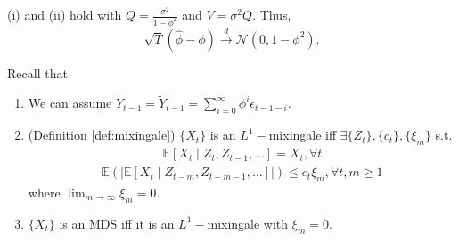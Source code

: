 \documentclass[11pt]{elegantbook}
\begin{document}
\begin{claim}
    (i) and (ii) hold with $Q=\frac{\sigma^2}{1-\phi^2}$ and $V=\sigma^2Q$. Thus, $$\sqrt{T}\left(\hat{\phi}-\phi\right) \stackrel{d}{\longrightarrow} \mathcal{N}\left(0,1-\phi^2\right).$$
\end{claim}


\begin{remark}
    Recall that
    \begin{enumerate}
        \item We can assume $Y_{t-1}=\tilde{Y}_{t-1}=\sum_{i=0}^\infty\phi^i\epsilon_{t-1-i}$.
        \item (Definition \ref{def:mixingale}) $\{X_t\}$ is an $L^1-$mixingale iff $\exists\{Z_t\},\{c_t\},\{\xi_m\}$ s.t.
        \begin{equation}
            \begin{aligned}
                \mathbb{E}[X_t\mid Z_t,Z_{t-1},...]=X_t,\forall t
            \end{aligned}
            \nonumber
        \end{equation}
        \begin{equation}
            \begin{aligned}
                \mathbb{E}\left(|\mathbb{E}[X_t\mid Z_{t-m},Z_{t-m-1},...]|\right)\leq c_t\xi_m,\forall t,m\geq 1
            \end{aligned}
            \nonumber
        \end{equation}
        where $\lim_{m \rightarrow \infty}\xi_m =0$.
        \item $\{X_t\}$ is an MDS iff it is an $L^1-$mixingale with $\xi_m=0$.
    \end{enumerate}
\end{remark}
\end{document}
